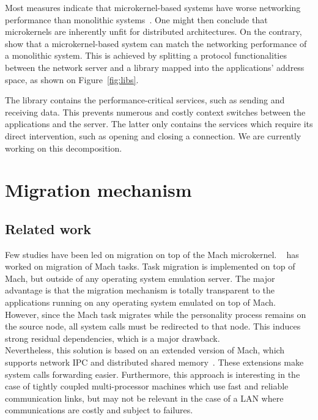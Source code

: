 Most measures indicate that microkernel-based systems have worse networking
performance than monolithic systems~\cite{Maeda92}. One might then conclude 
that microkernels are inherently unfit for distributed architectures.
On the contrary,~\cite{Maeda93} show that a microkernel-based system can 
match the networking performance of a monolithic system. 
This is achieved by
splitting a protocol functionalities between the network server and a
library mapped into the applications' address space, as shown on Figure~\ref{fig:libs}.


The library contains the performance-critical services, such as sending and
receiving data. This prevents numerous and costly context switches
between the applications and the server. The latter only
contains the services which require its direct intervention, 
such as opening and closing a connection. We are currently working on this decomposition.

\section {Migration mechanism}

\subsection {Related work}

Few studies have been led on migration on top of the Mach microkernel. 
~\cite{mach:milo93sedms} has worked
on migration of Mach tasks. Task migration is implemented on top of Mach,
but outside of any operating system emulation server. The major advantage is 
that
the migration mechanism is totally transparent to the applications running on
any operating system emulated on top of Mach.\\
However, since the Mach task migrates while the personality process 
remains on the source node, all system calls must be redirected to that
node. This induces strong residual dependencies, which is a major drawback.\\
 Nevertheless, this solution is based on an extended version 
of Mach, which supports network IPC and distributed shared 
memory~\cite{norma93}. These extensions make system calls forwarding easier.
Furthermore, this approach is interesting in the case of tightly coupled 
multi-processor 
machines which use fast and reliable communication links, but may not be
relevant in the case of a LAN where communications are costly
and subject to failures.


